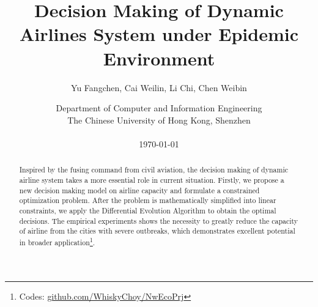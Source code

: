 \documentclass[11pt,twocolumn]{article}
\begin{document}
\title{Decision Making of Dynamic Airlines System under Epidemic Environment}

\author{Yu Fangchen, Cai Weilin, Li Chi, Chen Weibin \\
	\and
	Department of Computer and Information Engineering\\
	The Chinese University of Hong Kong, Shenzhen \\ \\
	\today
}


\maketitle

\small


\begin{abstract}
Inspired by the fusing command from civil aviation, the decision making of dynamic airline system takes a more essential role in current situation. Firstly, we propose a new decision making model on airline capacity and formulate a constrained optimization problem. After the problem is mathematically simplified into linear constraints, we apply the Differential Evolution Algorithm to obtain the optimal decisions. The empirical experiments shows the necessity to greatly reduce the capacity of airline from the cities with severe outbreaks, which demonstrates excellent potential in broader application\footnote{Codes: \url{github.com/WhiskyChoy/NwEcoPrj}}.
\end{abstract}

\end{document}
